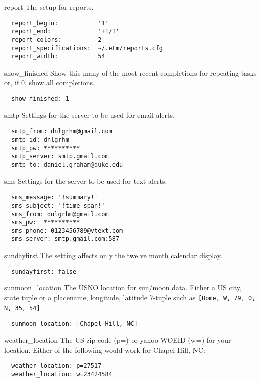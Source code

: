 \documentclass[9pt,landscape]{article}
\begin{document}
\begin{multicols}{3}
\begin{compactdesc}
\item[report] The setup for reports.
\begin{verbatim}
  report_begin:           '1'
  report_end:             '+1/1'
  report_colors:          2
  report_specifications:  ~/.etm/reports.cfg
  report_width:           54
\end{verbatim}

\item[show\_finished] Show this many of the most recent completions for repeating tasks or, if 0, show all completions.
\begin{verbatim}
  show_finished: 1
\end{verbatim}

\item[smtp] Settings for the server to be used for email alerts.
\begin{verbatim}
  smtp_from: dnlgrhm@gmail.com
  smtp_id: dnlgrhm
  smtp_pw: **********
  smtp_server: smtp.gmail.com
  smtp_to: daniel.graham@duke.edu
\end{verbatim}

\item[sms] Settings for the server to be used for text alerts.
\begin{verbatim}
  sms_message: '!summary!'
  sms_subject: '!time_span!'
  sms_from: dnlgrhm@gmail.com
  sms_pw:  **********
  sms_phone: 0123456789@vtext.com
  sms_server: smtp.gmail.com:587
\end{verbatim}

\item[sundayfirst] The setting affects only the twelve month calendar display.
\begin{verbatim}
  sundayfirst: false
\end{verbatim}

\item[sunmoon\_location] The USNO location for sun/moon data. Either a US city, state tuple or a placename, longitude, latitude 7-tuple such as \verb![Home, W, 79, 0, N, 35, 54]!.
\begin{verbatim}
  sunmoon_location: [Chapel Hill, NC]
\end{verbatim}

\item[weather\_location] The US zip code (p=) or yahoo WOEID (w=) for your location. Either of the following would work for Chapel Hill, NC:
\begin{verbatim}
  weather_location: p=27517
  weather_location: w=23424584
\end{verbatim}


\end{compactdesc}
\end{multicols}
\end{document}
